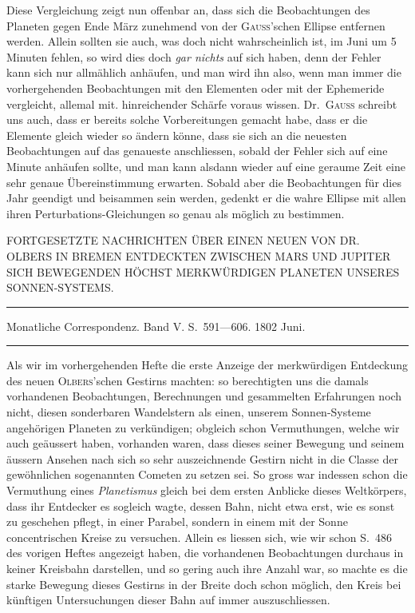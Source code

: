 Diese Vergleichung zeigt nun offenbar an, dass sich die Beobachtungen des Planeten gegen Ende März zunehmend von der \textsc{Gauss}'schen Ellipse entfernen werden. Allein sollten sie auch, was doch nicht wahrscheinlich ist, im Juni um 5 Minuten fehlen, so wird dies doch \textit{gar nichts} auf sich haben, denn der Fehler kann sich nur allmählich anhäufen, und man wird ihn also, wenn man immer die vorhergehenden Beobachtungen mit den Elementen oder mit der Ephemeride vergleicht, allemal mit. hinreichender Schärfe voraus wissen. Dr.\ \textsc{Gauss} schreibt uns auch, dass er bereits solche Vorbereitungen gemacht habe, dass er die Elemente gleich wieder so ändern könne, dass sie sich an die neuesten Beobachtungen auf das genaueste anschliessen, sobald der Fehler sich auf eine Minute anhäufen sollte, und man kann alsdann wieder auf eine geraume Zeit eine sehr genaue Übereinstimmung erwarten. Sobald aber die Beobachtungen für dies Jahr geendigt und beisammen sein werden, gedenkt er die wahre Ellipse mit allen ihren Perturbations-Gleichungen so genau als möglich zu bestimmen.
\begin{flushright}\end{flushright}
%
\bigskip{}
\begin{center}
{\small FORTGESETZTE NACHRICHTEN ÜBER EINEN NEUEN VON DR. OLBERS IN BREMEN ENTDECKTEN ZWISCHEN MARS UND JUPITER SICH BEWEGENDEN HÖCHST MERKWÜRDIGEN PLANETEN UNSERES SONNEN-SYSTEMS.\par}
\medskip\hrule\medskip
Monatliche Correspondenz. Band V. S.\ 591—606. 1802 Juni.\par
\medskip\hrule
\end{center}\medskip
Als wir im vorhergehenden Hefte die erste Anzeige der merkwürdigen Entdeckung des neuen \textsc{Olbers}'schen Gestirns machten: so berechtigten uns die damals vorhandenen Beobachtungen, Berechnungen und gesammelten Erfahrungen noch nicht, diesen sonderbaren Wandelstern als einen, unserem Sonnen-Systeme angehörigen Planeten zu verkündigen; obgleich schon Vermuthungen, welche wir auch geäussert haben, vorhanden waren, dass dieses seiner Bewegung und seinem äussern Ansehen nach sich so sehr auszeichnende Gestirn nicht in die Classe der gewöhnlichen sogenannten Cometen zu setzen sei. So gross war indessen schon die Vermuthung eines \textit{Planetismus} gleich bei dem ersten Anblicke dieses Weltkörpers, dass ihr Entdecker es sogleich wagte, dessen Bahn, nicht etwa erst, wie es sonst zu geschehen pflegt, in einer Parabel, sondern in einem mit der Sonne concentrischen Kreise zu versuchen. Allein es liessen sich, wie wir schon S.\ 486 des vorigen Heftes angezeigt haben, die vorhandenen Beobachtungen durchaus in keiner Kreisbahn darstellen, und so gering auch ihre Anzahl war, so machte es die starke Bewegung dieses Gestirns in der Breite doch schon möglich, den Kreis bei künftigen Untersuchungen dieser Bahn auf immer auszuschliessen.

